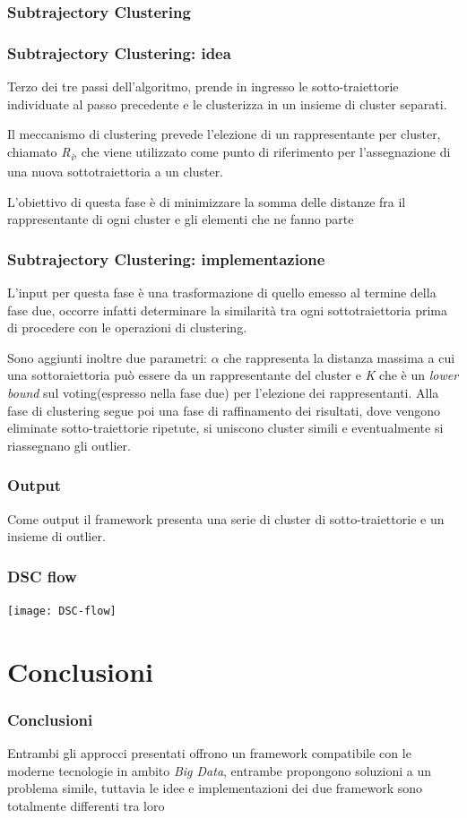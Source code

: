\documentclass{beamer}
\begin{document}
\subsubsection{Subtrajectory Clustering}

\begin{frame}
		\frametitle{Subtrajectory Clustering: idea}
		Terzo dei tre passi dell'algoritmo, prende in ingresso le sotto-traiettorie individuate al passo precedente e le clusterizza in un insieme di cluster separati.
		
		Il meccanismo di clustering prevede l'elezione di un rappresentante per cluster, chiamato \textit{R\textsubscript{i}}, che viene utilizzato come punto di riferimento per l'assegnazione di una nuova sottotraiettoria a un cluster.
		
		L'obiettivo di questa fase  è di minimizzare la somma delle distanze fra il rappresentante di ogni cluster e gli elementi che ne fanno parte
\end{frame}

\begin{frame}
	\frametitle{Subtrajectory Clustering: implementazione}
 	L'input per questa fase è una trasformazione di quello emesso al termine della fase due, occorre infatti determinare la similarità tra ogni sottotraiettoria prima di procedere con le operazioni di clustering.
 	
 	Sono aggiunti inoltre due parametri: $\alpha$ che rappresenta la distanza massima a cui una sottoraiettoria può essere da un rappresentante del cluster e \textit{K} che è un \textit{lower bound} sul voting(espresso nella fase due) per l'elezione dei rappresentanti.
 	Alla fase di clustering segue poi una fase di raffinamento dei risultati, dove vengono eliminate sotto-traiettorie ripetute, si uniscono cluster simili e eventualmente si riassegnano gli outlier.\ 
\end{frame}

\begin{frame}
	\frametitle{Output}
	Come output il framework presenta una serie di cluster di sotto-traiettorie e un insieme di outlier.
\end{frame}

\begin{frame}
	\frametitle{DSC flow}
\begin{center}
	\texttt{[image: DSC-flow]}
\end{center}
\end{frame}

\section{Conclusioni}
\begin{frame}
	\frametitle{Conclusioni}
	Entrambi gli approcci presentati offrono un framework compatibile con le moderne tecnologie in ambito \textit{Big Data}, entrambe propongono soluzioni a un problema simile, tuttavia le idee e implementazioni dei due framework sono totalmente differenti tra loro
\end{frame}




\begin{frame}
\titlepage %
\end{frame}

\end{document}
